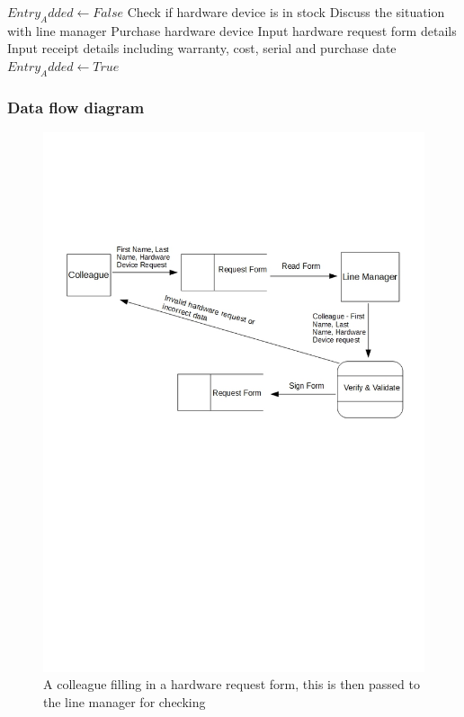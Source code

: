 \begin{algorithm}[H]
\begin{algorithmic}
\State $Entry_Added \leftarrow False$
	\State Check if hardware device is in stock
		\State Discuss the situation with line manager
	\Else
		\State Purchase hardware device
		\State Input hardware request form details
		\State Input receipt details including warranty, cost, serial and purchase date
		\State $Entry_Added \leftarrow True$
	\EndIf
\EndWhile
\end{algorithmic}
\end{algorithm}
		

\subsubsection{Data flow diagram}

\begin{figure}[H]
\includegraphics[width=\textwidth]{CurrentDFD.jpg}
\caption{A colleague filling in a hardware request form, this is then passed to the line manager for checking} \label{Page1Interview}
\end{figure}

